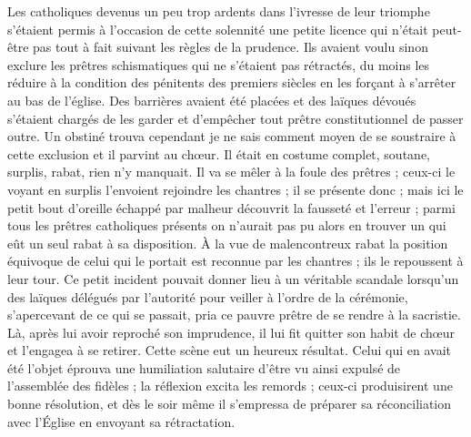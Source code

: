 Les catholiques devenus un peu trop ardents dans l'ivresse de leur triomphe s'étaient permis à l'occasion de cette solennité une petite licence qui n'était peut-être pas tout à fait suivant les règles de la prudence. Ils avaient voulu sinon exclure les prêtres schismatiques qui ne s'étaient pas rétractés, du moins les réduire à la condition des pénitents des premiers siècles en les forçant à s'arrêter au bas de l'église. Des barrières avaient été placées et des laïques dévoués s'étaient chargés de les garder et d'empêcher tout prêtre constitutionnel de passer outre. Un obstiné trouva cependant je ne sais comment moyen de se soustraire à cette exclusion et il parvint au chœur. Il était en costume complet, soutane, surplis, rabat, rien n’y manquait. Il va se mêler à la foule des prêtres ; ceux-ci le voyant en surplis l'envoient rejoindre les chantres ; il se présente donc ; mais ici le petit bout d'oreille échappé par malheur découvrit la fausseté et l'erreur ; parmi tous les prêtres catholiques présents on n'aurait pas pu alors en trouver un qui eût un seul rabat à sa disposition. À la vue de malencontreux rabat la position équivoque de celui qui le portait est reconnue par les chantres ; ils le repoussent à leur tour. Ce petit incident pouvait donner lieu à un véritable scandale lorsqu'un des laïques délégués par l'autorité pour veiller à l'ordre de la cérémonie, s'apercevant de ce qui se passait, pria
ce pauvre prêtre de se rendre à la sacristie. Là, après lui avoir reproché son imprudence, il lui fit quitter son habit de chœur et l'engagea à se retirer. Cette scène eut un heureux résultat. Celui qui en avait été l'objet éprouva une humiliation salutaire d'être vu ainsi expulsé de l'assemblée des fidèles ; la réflexion excita les remords ; ceux-ci produisirent une bonne résolution, et dès le soir même il s'empressa de préparer sa réconciliation avec l'Église en envoyant sa rétractation.

